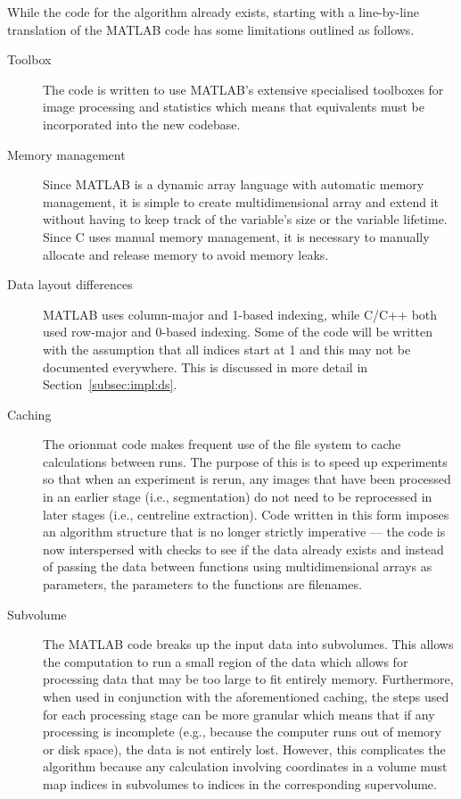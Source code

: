 While the code for the algorithm already exists, starting with a line-by-line
translation of the MATLAB code has some limitations outlined as follows.
\begin{description}
\item[Toolbox\label{desc:matlab:toolbox}] The code is written to use MATLAB's extensive 
	specialised toolboxes for image processing and
	statistics which means that equivalents must be
	incorporated into the new codebase.
\item[Memory management\label{desc:matlab:mem}] Since MATLAB is a dynamic array language with
	automatic memory management, it is simple to create
	multidimensional array and extend it without having to
	keep track of the variable's size or the variable
	lifetime. Since C uses manual memory management, it is
	necessary to manually allocate and release memory to avoid
	memory leaks.
\item[Data layout differences]
	MATLAB uses column-major and 1-based indexing, while C/C++
	both used row-major and 0-based indexing. Some of the code
	will be written with the assumption that all indices start
	at 1 and this may not be documented everywhere. This is
	discussed in more detail in Section~\ref{subsec:impl:ds}.
\item[Caching\label{desc:matlab:cache}] The \gls{orionmat} code makes frequent use of the file system
	to cache calculations between runs. The purpose of this is
	to speed up experiments so that when an experiment is
	rerun, any images that have been processed in an earlier
	stage (i.e., segmentation) do not need to be reprocessed
	in later stages (i.e., centreline extraction). Code
	written in this form imposes an algorithm structure
	that is no longer strictly imperative --- the code is now
	interspersed with checks to see if the data already exists
	and instead of passing the data between functions using
	multidimensional arrays as parameters, the parameters to
	the functions are filenames.
\item[Subvolume\label{desc:matlab:subvol}] The MATLAB code breaks up the input data into
	subvolumes. This allows the computation to run a small
	region of the data which allows for processing data that
	may be too large to fit entirely memory. Furthermore, when
	used in conjunction with the aforementioned caching, the
	steps used for each processing stage can be more granular
	which means that if any processing is incomplete (e.g.,
	because the computer runs out of memory or disk space),
	the data is not entirely lost. However, this complicates
	the algorithm because any calculation involving
	coordinates in a volume must map indices in subvolumes to
	indices in the corresponding supervolume.
\end{description}

